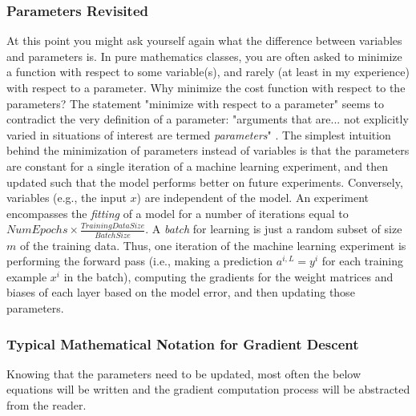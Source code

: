 \documentclass{article}
\begin{document}
\subsubsection{Parameters Revisited}

\quad At this point you might ask yourself again what the difference between
variables and parameters is. In pure mathematics classes, you are often asked
to minimize a function with respect to some variable(s), and rarely (at least in
my experience) with respect to a parameter. Why minimize the cost
function with respect to the parameters? The statement "minimize with respect
to a parameter" seems to contradict the very definition of a parameter:
"arguments that are... not explicitly varied in situations of interest are termed
\textit{parameters}" \cite{WolframMathWorldParameterDefinition}. The simplest intuition
behind the minimization of parameters instead of variables
is that the parameters are constant for a single iteration
of a machine learning experiment, and then updated such that the model performs
better on future experiments. Conversely, variables (e.g., the input $x$) are
independent of the model. An experiment encompasses the \textit{fitting} of a
model for a number of iterations equal to
$NumEpochs \times \frac{TrainingDataSize}{BatchSize}$. A \textit{batch} for learning
is just a random subset of size $m$ of the training data. Thus, one iteration of the
machine learning experiment is performing the forward pass (i.e., making a prediction
$a^{i, L} = y^{i}$ for each training example $x^{i}$ in the batch),
computing the gradients for the weight matrices and biases of each layer based on the
model error, and then updating those parameters.

\subsubsection{Typical Mathematical Notation for Gradient Descent}

\quad Knowing that the parameters need to be updated, most often the below equations
will be written and the gradient computation process will be abstracted from
the reader.
\end{document}
